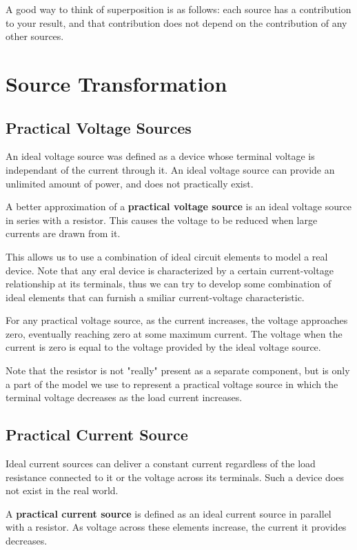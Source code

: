 \documentclass[12pt]{article}
\begin{document}
A good way to think of superposition is as follows: each source has a contribution to your result, and that contribution does not depend on the contribution of any other sources.

\section*{Source Transformation}
\subsection*{Practical Voltage Sources}
An ideal voltage source was defined as a device whose terminal voltage is independant of the current through it. An ideal voltage source can provide an unlimited amount of power, and does not practically exist.

A better approximation of a {\bf practical voltage source} is an ideal voltage source in series with a resistor. This causes the voltage to be reduced when large currents are drawn from it.

This allows us to use a combination of ideal circuit elements to model a real device. Note that any eral device is characterized by a certain current-voltage relationship at its terminals, thus we can try to develop some combination of ideal elements that can furnish a smiliar current-voltage characteristic.

For any practical voltage source, as the current increases, the voltage approaches zero, eventually reaching zero at some maximum current. The voltage when the current is zero is equal to the voltage provided by the ideal voltage source.

Note that the resistor is not "really" present as a separate component, but is only a part of the model we use to represent a practical voltage source in which the terminal voltage decreases as the load current increases.

\subsection*{Practical Current Source}
Ideal current sources can deliver a constant current regardless of the load resistance connected to it or the voltage across its terminals. Such a device does not exist in the real world.

A {\bf practical current source} is defined as an ideal current source in parallel with a resistor. As voltage across these elements increase, the current it provides decreases.
\end{document}
